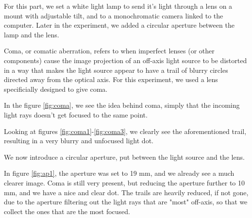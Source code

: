 
For this part, we set a white light lamp to send it's light through
a lens on a mount with adjustable tilt, and to a monochromatic camera
linked to the computer. Later in the experiment, we added a circular
aperture between the lamp and the lens. 

Coma, or comatic aberration, refers to when imperfect lenses 
(or other components) cause the image projection of an off-axis 
light source to be distorted in a way that makes the light source
appear to have a trail of blurry circles directed away from the 
optical axis. For this experiment, we used a lens specificially 
designed to give coma. 

In the figure \vref{fig:coma}, we see the idea behind coma, 
simply that the incoming light rays doesn't get focused to the same point.



Looking at figures \vref{fig:coma1}-\vref{fig:coma3}, we clearly see the aforementioned
trail, resulting in a very blurry and unfocused light dot.

We now introduce a circular aperture, put between the light source and the lens.

In figure \vref{fig:ap1}, the aperture was set to 19 mm, and we already see
a much clearer image. Coma is still very present, but reducing the aperture
further to 10 mm, and we have a nice and clear dot. The trails are heavily 
reduced, if not gone, due to the aperture filtering out the light rays that 
are "most" off-axis, so that we collect the ones that are the most focused.

